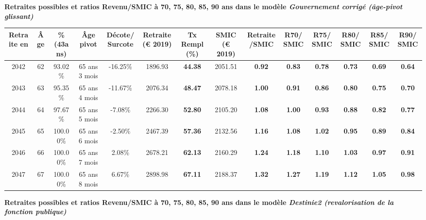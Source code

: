  \vspace{0.1cm} 
{\bf \noindent Retraites possibles et ratios Revenu/SMIC à 70, 75, 80, 85, 90 ans dans le modèle \emph{Gouvernement corrigé (âge-pivot glissant)}}  
 
\begin{adjustbox}{max width=\textwidth} 
\begin{tabular}[htb]{|c|c||c|c|c||c|c||c|c||c|c|c|c|c|} 
\hline 
 Retraite en &  Âge &  \%(43ans) &  Âge pivot &  Décote/Surcote &  Retraite (\euro{} 2019) &  Tx Rempl(\%) &  SMIC (\euro{} 2019) &  Retraite/SMIC &  R70/SMIC &  R75/SMIC &  R80/SMIC &  R85/SMIC &  R90/SMIC \\ 
\hline \hline 
 2042 &  62 &  93.02\% &  65 ans 3 mois &  -16.25\% &  1896.93 &  {\bf 44.38} &  2051.51 &  {\bf {\color{red} 0.92}} &  {\bf {\color{red} 0.83}} &  {\bf {\color{red} 0.78}} &  {\bf {\color{red} 0.73}} &  {\bf {\color{red} 0.69}} &  {\bf {\color{red} 0.64}} \\ 
\hline 
 2043 &  63 &  95.35\% &  65 ans 4 mois &  -11.67\% &  2076.34 &  {\bf 48.47} &  2078.18 &  {\bf {\color{red} 1.00}} &  {\bf {\color{red} 0.91}} &  {\bf {\color{red} 0.86}} &  {\bf {\color{red} 0.80}} &  {\bf {\color{red} 0.75}} &  {\bf {\color{red} 0.70}} \\ 
\hline 
 2044 &  64 &  97.67\% &  65 ans 5 mois &  -7.08\% &  2266.30 &  {\bf 52.80} &  2105.20 &  {\bf 1.08} &  {\bf {\color{red} 1.00}} &  {\bf {\color{red} 0.93}} &  {\bf {\color{red} 0.88}} &  {\bf {\color{red} 0.82}} &  {\bf {\color{red} 0.77}} \\ 
\hline 
 2045 &  65 &  100.00\% &  65 ans 6 mois &  -2.50\% &  2467.39 &  {\bf 57.36} &  2132.56 &  {\bf 1.16} &  {\bf 1.08} &  {\bf 1.02} &  {\bf {\color{red} 0.95}} &  {\bf {\color{red} 0.89}} &  {\bf {\color{red} 0.84}} \\ 
\hline 
 2046 &  66 &  100.00\% &  65 ans 7 mois &  2.08\% &  2678.21 &  {\bf 62.13} &  2160.29 &  {\bf 1.24} &  {\bf 1.18} &  {\bf 1.10} &  {\bf 1.03} &  {\bf {\color{red} 0.97}} &  {\bf {\color{red} 0.91}} \\ 
\hline 
 2047 &  67 &  100.00\% &  65 ans 8 mois &  6.67\% &  2898.98 &  {\bf 67.11} &  2188.37 &  {\bf 1.32} &  {\bf 1.27} &  {\bf 1.19} &  {\bf 1.12} &  {\bf 1.05} &  {\bf {\color{red} 0.98}} \\ 
\hline 
\hline 
\end{tabular} 
\end{adjustbox} 
 
 \vspace{0.1cm} 
{\bf \noindent Retraites possibles et ratios Revenu/SMIC à 70, 75, 80, 85, 90 ans dans le modèle \emph{Destinie2 (revalorisation de la fonction publique)}}  
 
